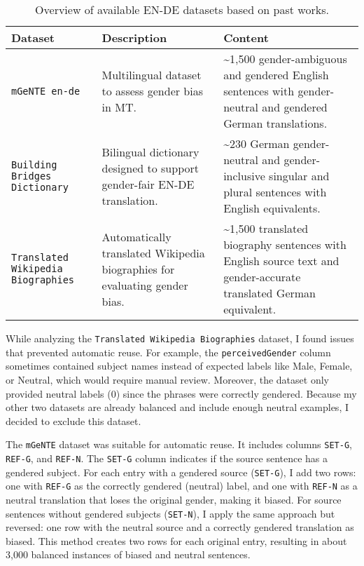 \begin{table}[ht!]
    \centering
    \renewcommand{\arraystretch}{1.3}
    \begin{tabularx}{\textwidth}{|>{\raggedright\arraybackslash}X|>{\raggedright\arraybackslash}X|>{\raggedright\arraybackslash}X|}
    \hline
    \textbf{Dataset} & \textbf{Description} & \textbf{Content} \\ \hline
    \texttt{mGeNTE en-de} \citep{savoldiMGeNTEMultilingualResource2025} & Multilingual dataset to assess gender bias in MT. & \textasciitilde1,500 gender-ambiguous and gendered English sentences with gender-neutral and gendered German translations. \\ \hline
    \texttt{Building Bridges Dictionary} \citep{lardelliBuildingBridgesDataset2024} & Bilingual dictionary designed to support gender-fair EN-DE translation. & \textasciitilde230 German gender-neutral and gender-inclusive singular and plural sentences with English equivalents. \\ \hline
    \texttt{Translated Wikipedia Biographies} \citep{stellaDatasetStudyingGender2021} & Automatically translated Wikipedia biographies for evaluating gender bias. & \textasciitilde1,500 translated biography sentences with English source text and gender-accurate translated German equivalent. \\ \hline
    \end{tabularx}
    \caption{Overview of available EN-DE datasets based on past works.}
    \label{tab:available_datasets}
\end{table}

While analyzing the \texttt{Translated Wikipedia Biographies} dataset, I found issues that prevented automatic reuse. For example, the \texttt{perceivedGender} column sometimes contained subject names instead of expected labels like Male, Female, or Neutral, which would require manual review. Moreover, the dataset only provided neutral labels (0) since the phrases were correctly gendered. Because my other two datasets are already balanced and include enough neutral examples, I decided to exclude this dataset.

The \texttt{mGeNTE} dataset was suitable for automatic reuse. It includes columns \texttt{SET-G}, \texttt{REF-G}, and \texttt{REF-N}. The \texttt{SET-G} column indicates if the source sentence has a gendered subject. For each entry with a gendered source (\texttt{SET-G}), I add two rows: one with \texttt{REF-G} as the correctly gendered (neutral) label, and one with \texttt{REF-N} as a neutral translation that loses the original gender, making it biased. For source sentences without gendered subjects (\texttt{SET-N}), I apply the same approach but reversed: one row with the neutral source and a correctly gendered translation as biased. This method creates two rows for each original entry, resulting in about 3,000 balanced instances of biased and neutral sentences.

